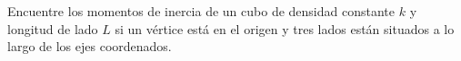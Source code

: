 \item Encuentre los momentos de inercia de un cubo de densidad constante $k$ y longitud de lado $L$ si un vértice está en el origen y tres lados están situados a lo largo de los ejes coordenados.
